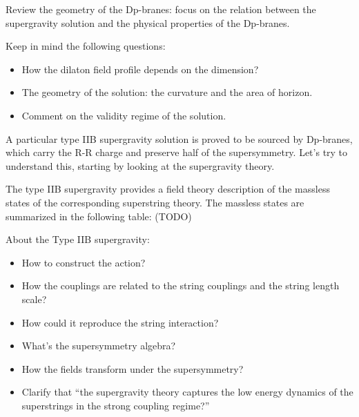 \begin{todo}
Review the geometry of the Dp-branes:
focus on the relation between the supergravity solution
and the physical properties of the Dp-branes.

Keep in mind the following questions:
\begin{itemize}
	\item How the dilaton field profile depends on the dimension?
	\item The geometry of the solution: the curvature and the area of horizon.
	\item Comment on the validity regime of the solution.
\end{itemize}
\end{todo}

A particular type IIB supergravity solution is proved to be sourced by Dp-branes, which carry the R-R charge and preserve half of the supersymmetry.
Let's try to understand this, starting by looking at the supergravity theory.

The type IIB supergravity provides a field theory description of the massless states of the corresponding superstring theory.
The massless states are summarized in the following table: (TODO)

\begin{question}
	About the Type IIB supergravity:
	\begin{itemize}
		\item How to construct the action?
		\item How the couplings are related to the string couplings
			and the string length scale?
		\item How could it reproduce the string interaction?
		\item What's the supersymmetry algebra?
		\item How the fields transform under the supersymmetry?
		\item Clarify that ``the supergravity theory
			captures the low energy dynamics of the superstrings
			in the strong coupling regime?''
	\end{itemize}
\end{question}

